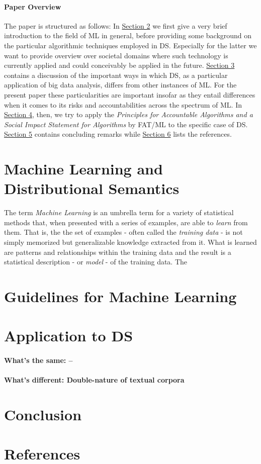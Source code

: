 \documentclass{article}
\begin{document}
\paragraph{Paper Overview}
The paper is structured as follows: In \hyperlink{sec2}{Section 2} we first give a very brief introduction to the field of ML in general, before providing some background on the particular algorithmic techniques employed in DS. Especially for the latter we want to provide overview over societal domains where such technology is currently applied and could conceivably be applied in the future. \hyperlink{sec3}{Section 3} contains a discussion of the important ways in which DS, as a particular application of big data analysis, differs from other instances of ML. For the present paper these particularities are important insofar as they entail differences when it comes to its risks and accountabilities across the spectrum of ML. In \hyperlink{sec4}{Section 4}, then, we try to apply the \emph{Principles for Accountable Algorithms and a Social Impact Statement for Algorithms} by FAT/ML to the specific case of DS. \hyperlink{sec5}{Section 5} contains concluding remarks while \hyperlink{sec6}{Section 6} lists the references.
\section{Machine Learning and Distributional Semantics}\hypertarget{sec3}{ }
The term \emph{Machine Learning} is an umbrella term for a variety of statistical methods that, when presented with a series of examples, are able to \emph{learn} from them. That is, the the set of examples - often called the \emph{training data} - is not simply memorized but generalizable knowledge extracted from it. \cite{domingos2012few}
 What is learned are patterns and relationships within the training data and the result is a statistical description - or \emph{model} - of the training data. \cite{fayyad2001digital}  
 The
\section{Guidelines for Machine Learning}\hypertarget{sec2}{}

\section{Application to DS}\hypertarget{sec4}{ }
\paragraph{What's the same: --}
\paragraph{What's different: Double-nature of textual corpora}
\section{Conclusion}

\section{References}\hypertarget{sec5}{ }
\end{document}
